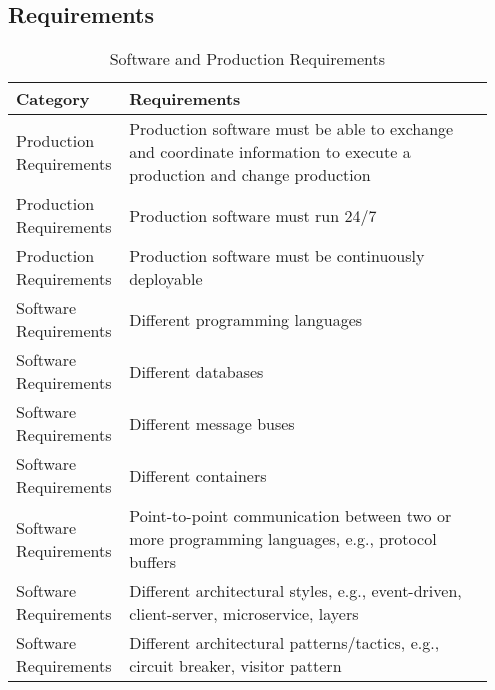 \onecolumn
\appendix

\subsection{Requirements}\label{Requirements}

\begin{table}[h]
\caption{Software and Production Requirements}

\normalsize 
\begin{tabular}{|p{0.2\linewidth}|p{0.75\linewidth}|}
\hline
\textbf{Category} & \textbf{Requirements} \\ \hline
Production Requirements & Production software must be able to exchange and coordinate information to execute a production and change production \\ \hline
Production Requirements & Production software must run 24/7 \\ \hline
Production Requirements & Production software must be continuously deployable \\ \hline
Software Requirements & Different programming languages \\ \hline
Software Requirements & Different databases \\ \hline
Software Requirements & Different message buses \\ \hline
Software Requirements & Different containers \\ \hline
Software Requirements & Point-to-point communication between two or more programming languages, e.g., protocol buffers \\ \hline
Software Requirements & Different architectural styles, e.g., event-driven, client-server, microservice, layers \\ \hline
Software Requirements & Different architectural patterns/tactics, e.g., circuit breaker, visitor pattern \\ \hline
\end{tabular}
\end{table}


